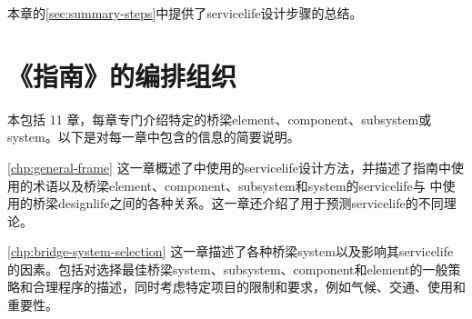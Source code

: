 本章的\cref{sec:summary-steps}中提供了\gls*{servicelife}设计步骤的总结。

\section{《指南》的编排组织}

本包括 11 章，每章专门介绍特定的桥梁\gls*{element}、\gls*{component}、\gls*{subsystem}或\gls*{system}。以下是对每一章中包含的信息的简要说明。

\cref{chp:general-frame}  这一章概述了中使用的\gls*{servicelife}设计方法，并描述了指南中使用的术语以及桥梁\gls*{element}、\gls*{component}、\gls*{subsystem}和\gls*{system}的\gls*{servicelife}与 \lrfd 中使用的桥梁\gls*{designlife}之间的各种关系。这一章还介绍了用于预测\gls*{servicelife}的不同理论。


\cref{chp:bridge-system-selection}  这一章描述了各种桥梁\gls*{system}以及影响其\gls*{servicelife}的因素。包括对选择最佳桥梁\gls*{system}、\gls*{subsystem}、\gls*{component}和\gls*{element}的一般策略和合理程序的描述，同时考虑特定项目的限制和要求，例如气候、交通、使用和重要性。

